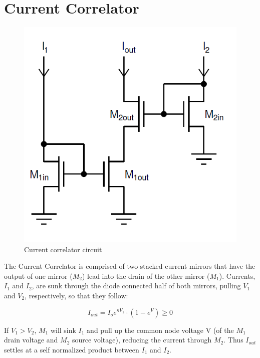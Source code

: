 \documentclass[main]{subfiles}
\begin{document}

\section{Current Correlator}

\begin{figure}[htbp]
  \centering
  \includegraphics[scale=0.7]{figs/Current_correlator_circuit.png}
  \caption{Current correlator circuit}
  \label{fig:Current_correlator_circuit}
\end{figure}

The Current Correlator is comprised of two stacked current mirrors that have the output of one mirror ($M_2$) lead into the drain of the other mirror ($M_1$). Currents, $I_1$ and $I_2$, are sunk through the diode connected half of both mirrors, pulling $V_1$ and $V_2$, respectively, so that they follow: 

\begin{equation}
I_{out} = I_o e^{\kappa V_1}\cdot(1-e^{V}) \geq 0
\end{equation}


If $V_1 > V_2$, $M_1$ will sink $I_1$ and pull up the common node voltage V (of the $M_1$ drain voltage and $M_2$ source voltage), reducing the current through $M_2$. Thus $I_{out}$ settles at a self normalized product between $I_1$ and $I_2$. 
\end{document}
